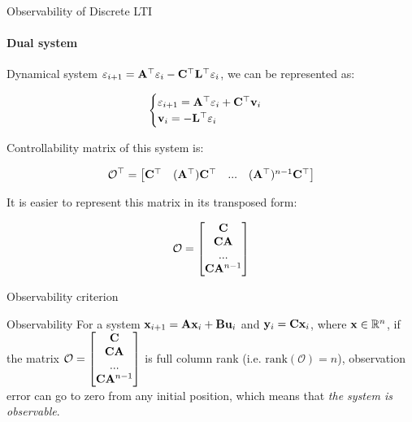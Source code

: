 \documentclass{beamer}
\begin{document}
\begin{frame}{Observability of Discrete LTI}
\framesubtitle{Dual system}
\begin{flushleft}

Dynamical system $\varepsilon_{i+1} = \mathbf{A}^\top \varepsilon_i - \mathbf{C}^\top \mathbf{L}^\top \varepsilon_i$, we can be represented as:

\begin{equation}
\begin{cases}
\varepsilon_{i+1} = \mathbf{A}^\top \varepsilon_i + \mathbf{C}^\top \mathbf{v}_i \\
\mathbf{v}_i = - \mathbf{L}^\top \varepsilon_i
\end{cases}
\end{equation}

Controllability matrix of this system is:

\begin{equation}
\mathcal{O}^\top = \begin{bmatrix}
    \mathbf{C}^\top &
    (\mathbf{A}^\top) \mathbf{C}^\top & ... &
    (\mathbf{A}^\top)^{n - 1} \mathbf{C}^\top
    \end{bmatrix}
\end{equation}

It is easier to represent this matrix in its transposed form:

\begin{equation}
\mathcal{O} = \begin{bmatrix}
    \mathbf{C} \\
    \mathbf{C}\mathbf{A}  \\ ... \\
    \mathbf{C}\mathbf{A}^{n - 1}
    \end{bmatrix}
\end{equation}

\end{flushleft}
\end{frame}


\begin{frame}{Observability criterion}
\begin{flushleft}

\begin{block}{Observability}
For a system $\mathbf{x}_{i+1} = \mathbf{A}  \mathbf{x}_i + \mathbf{B} \mathbf{u}_i$ and $\mathbf{y}_i = \mathbf{C}  \mathbf{x}_i$, where $\mathbf{x} \in \mathbb{R}^n$, if the matrix $\mathcal{O} = \begin{bmatrix}
    \mathbf{C} \\
    \mathbf{C}\mathbf{A}  \\ ... \\
    \mathbf{C}\mathbf{A}^{n - 1}
    \end{bmatrix}$ is full column rank (i.e. $\text{rank}(\mathcal{O}) = n$), observation error can go to zero from any initial position, which means that \emph{the system is observable}.
\end{block}

\end{flushleft}
\end{frame}
\end{document}
